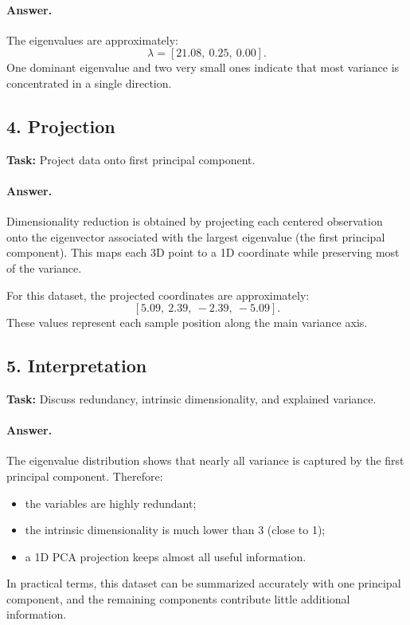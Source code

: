 \paragraph{Answer.}
The eigenvalues are approximately:
\[
\lambda = [21.08,\ 0.25,\ 0.00].
\]
One dominant eigenvalue and two very small ones indicate that most variance is concentrated in a single direction.

\subsection{4. Projection}
\textbf{Task:} Project data onto first principal component.

\paragraph{Answer.}
Dimensionality reduction is obtained by projecting each centered observation onto the eigenvector associated with the largest eigenvalue (the first principal component). This maps each 3D point to a 1D coordinate while preserving most of the variance.

For this dataset, the projected coordinates are approximately:
\[
[5.09,\ 2.39,\ -2.39,\ -5.09].
\]
These values represent each sample position along the main variance axis.

\subsection{5. Interpretation}
\textbf{Task:} Discuss redundancy, intrinsic dimensionality, and explained variance.

\paragraph{Answer.}
The eigenvalue distribution shows that nearly all variance is captured by the first principal component. Therefore:
\begin{itemize}
  \item the variables are highly redundant;
  \item the intrinsic dimensionality is much lower than 3 (close to 1);
  \item a 1D PCA projection keeps almost all useful information.
\end{itemize}
In practical terms, this dataset can be summarized accurately with one principal component, and the remaining components contribute little additional information.
